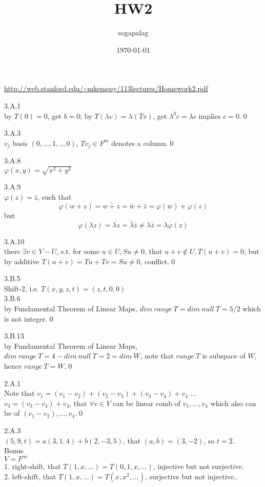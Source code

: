 \documentclass[paper=a4, fontsize=11pt]{scrartcl} %
\title{HW2}
\author{sogapalag}
\date{\normalsize\today}
\numberwithin{equation}{section} %
\numberwithin{figure}{section} %
\numberwithin{table}{section} %
\begin{document}
\maketitle 
\url{http://web.stanford.edu/~mkemeny/113lectures/Homework2.pdf}

3.A.1\\
by $T(0)=0$, get $b=0$; by $T(\lambda v)=\lambda (Tv)$, get $\lambda^3 c=\lambda c$ implies $c=0$.\qed

3.A.3\\
$v_j$ basis $(0,...,1,..,0)$, $Tv_j\in F^m$ denotes a column.\qed

3.A.8\\
$\varphi(x,y) = \sqrt{x^2 +y^2}$

3.A.9\\
$\varphi(z) = \bar{z}$, such that
\begin{equation}
	\varphi(w+z) = \bar{w+z} = \bar{w} + \bar{z} = \varphi(w) + \varphi(z)
\end{equation}
but
\begin{equation}
	\varphi(\lambda z) = \bar{\lambda z} = \bar{\lambda} \bar{z} \neq \lambda \bar{z} = \lambda \varphi(z)
\end{equation}

3.A.10\\
there $\exists v\in V-U$, s.t. for some $u\in U, Su\neq 0$, that $u+v \notin U, T(u+v)=0$, but by additive $T(u+v)=Tu +Tv = Su\neq 0$, conflict.\qed

3.B.5\\
Shift-2, i.e. $T(x,y,z,t) = (z,t,0,0)$\\

3.B.6\\
by Fundamental Theorem of Linear Maps, $dim\ range\ T = dim\ null\ T = 5/2$ which is not integer.\qed

3.B.13\\
by Fundamental Theorem of Linear Maps, $dim\ range\ T = 4 - dim\ null\ T = 2  = dim\ W$, note that $range\ T$ is subspace of $W$, hence $range\ T = W$.\qed

2.A.1\\
Note that $v_1 = (v_1-v_2)+(v_2-v_3)+(v_3-v_4)+v_4$ ... $v_3 = (v_3-v_4) + v_4$, that $\forall v\in V$ can be linear comb of $v_1, ...,v_4$ which also can be of $(v_1-v_2),...,v_4$.\qed

2.A.3\\
$(5,9,t) = a(3,1,4)+b(2,-3,5)$, that $(a,b)= (3,-2)$, so $t = 2$.\\

Bonus\\
$V= F^\infty$\\
1. right-shift, that $T(1,x,...) = T(0,1,x,...)$, injective but not surjective.\\
2. left-shift, that $T(1, x,...) = T(x,x^2,...)$, surjective but not injective..
\end{document}
